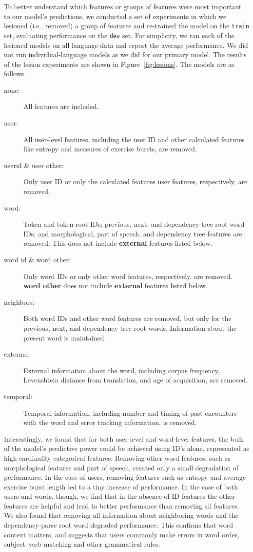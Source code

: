 \documentclass[11pt,a4paper]{article}
\begin{document}
To better understand which features or groups of features were most important to
our model's predictions, we conducted a set of experiments in which we lesioned
(i.e., removed) a group of features and re-trained the model on the {\tt train}
set, evaluating performance on the {\tt dev} set. For simplicity, we ran each of the
lesioned models on all language data and report the average
performance. We did not run individual-language models as we did for our primary model.
The results of the lesion experiments are shown in Figure~\ref{fig:lesions}. The
models are as follows.
\begin{description}
  \item[none:] All features are included.  
  \item[user:] All user-level features, including the user ID and other
    calculated features like entropy and measures of exercise bursts, are
    removed.
  \item[userid \& user other:] Only user ID or only the calculated
    features user features, respectively, are removed.
  \item[word:] Token and token root IDs; previous, next, and dependency-tree
    root word IDs; and morphological, part of speech, and dependency tree
    features are removed. This does not include {\bf external} features listed below.
  \item[word id \& word other:] Only word IDs or only other
    word features, respectively, are removed. {\bf word other} does not include {\bf external} features listed below.
  \item[neighbors:] Both word IDs and other word features are removed, but
    only for the previous, next, and dependency-tree root words. Information
    about the present word is maintained.
  \item[external:] External information about the word, including corpus
    frequency, Levenshtein distance from translation, and age of acquisition,
    are removed.
  \item[temporal:] Temporal information, including number and timing of
    past encounters with the word and error tracking information, is removed.
\end{description}

Interestingly, we found that for both user-level and word-level features, the
bulk of the model's predictive power could be achieved using ID's alone,
represented as high-cardinality categorical features. Removing other word features,
such as morphological features and part of speech, created only a small
degradation of performance. In the case of users, removing features such as
entropy and average exercise burst length led to a tiny increase of performance.
In the case of both users and words, though, we find that in the absence of ID
features the other features are helpful and lead to better performance than
removing all features. We also found that removing all information about
neighboring words and the dependency-parse root word degraded performance. This
confirms that word context matters, and suggests that users commonly make errors in word order,
subject--verb matching and other grammatical rules.
\end{document}
